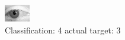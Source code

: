 \begin{figure}[h!]
\begin{center}
\includegraphics[width=0.60\columnwidth]{figures/ID2810_class_4_target_3.png}
\end{center}
\caption{ Classification: 4 actual target: 3}
\label{fig:ID2810_class_4_target_3}
\end{figure}
